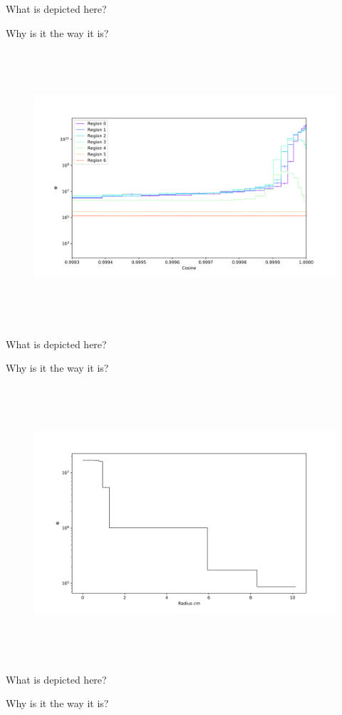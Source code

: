 What is depicted here?

Why is it the way it is?

\clearpage

%
\begin{figure}[htb]
\centering
\includegraphics[height=4in]{tex/figures/flux_rad_cos_detail.png}
\caption[]{}
\label{fig:}
\end{figure}

What is depicted here?

Why is it the way it is?

\clearpage

%
\begin{figure}[htb]
\centering
\includegraphics[height=4in]{tex/figures/flux_rad.png}
\caption[]{}
\label{fig:}
\end{figure}

What is depicted here?

Why is it the way it is?

\clearpage
